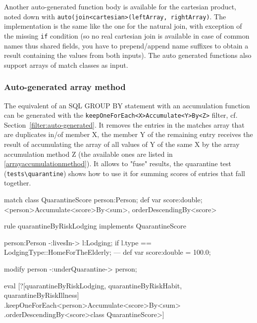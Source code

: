 Another auto-generated function body is available for the cartesian product, noted down with \texttt{auto(join<cartesian>(leftArray, rightArray)}.
The implementation is the same like the one for the natural join, with exception of the missing \texttt{if} condition (so no real cartesian join is available in case of common names thus shared fields, you have to prepend/append name suffixes to obtain a result containing the values from both inputs).
The auto generated functions also support arrays of match classes as input.

\subsubsection*{Auto-generated array method}

The equivalent of an SQL GROUP BY statement with an accumulation function can be generated with the \texttt{keepOneForEach<X>Accumulate<Y>By<Z>} filter, cf. Section~\ref{filter:auto-generated}.
It removes the entries in the matches array that are duplicates in/of member X, the member Y of the remaining entry receives the result of accumulating the array of all values of Y of the same X by the array accumulation method Z (the available ones are listed in \ref{arrayaccumulationmethod}).
It allows to "fuse" results, the quarantine test (\verb#tests\quarantine#) shows how to use it for summing scores of entries that fall together.

\begin{example}
  \begin{grgen}
match class QuarantineScore
{
	person:Person;
	def var score:double;
} \keepOneForEach<person>Accumulate<score>By<sum>, orderDescendingBy<score>

rule quarantineByRiskLodging implements QuarantineScore
{
	person:Person -:livesIn-> l:Lodging;
	if { l.type == LodgingType::HomeForTheElderly; }
---
	def var score:double = 100.0;
	
	modify {
		person -:underQuarantine-> person;
	}
}
  \end{grgen}\label{exkeeponeforeachaccumulatebyfilter}

	\begin{grshell}
	eval [?[quarantineByRiskLodging, quarantineByRiskHabit, quarantineByRiskIllness]
		\QuarantineScore.keepOneForEach<person>Accumulate<score>By<sum>
		\QuarantineScore.orderDescendingBy<score>\<class QuarantineScore>]
	\end{grshell}
\end{example}

